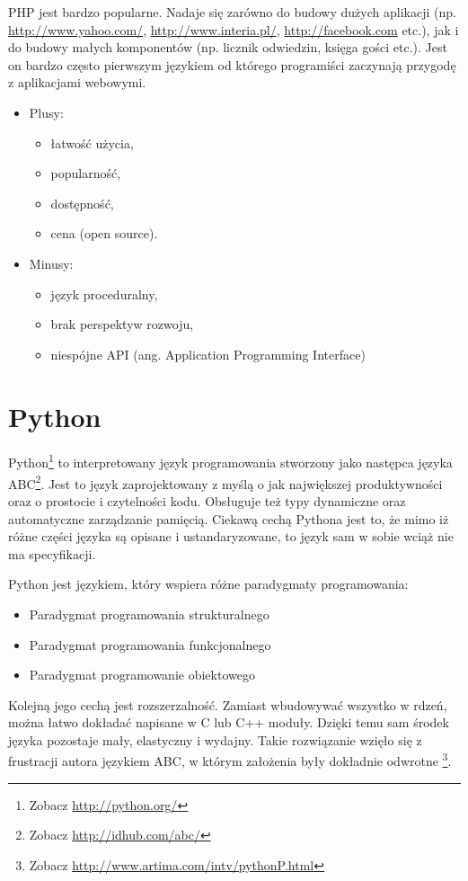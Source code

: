 \documentclass[a4paper,12pt,oneside]{report}
\begin{document}
PHP jest bardzo popularne. Nadaje się zarówno do budowy dużych aplikacji (np. \url{http://www.yahoo.com/}, \url{http://www.interia.pl/}, \url{http://facebook.com} etc.), jak i do budowy małych komponentów (np. licznik odwiedzin, księga gości etc.). Jest on bardzo często pierwszym językiem od którego programiści zaczynają przygodę z aplikacjami webowymi.
\begin{itemize}
\item Plusy:
  \begin{itemize}
  \item łatwość użycia, 
  \item popularność,
  \item dostępność,
  \item cena (open source).
  \end{itemize}
\item Minusy:
  \begin{itemize}
  \item język proceduralny,
  \item brak perspektyw rozwoju,
  \item niespójne API (ang. Application Programming Interface)
  \end{itemize}
\end{itemize}

\section{Python}
\label{sec:python}
Python\footnote{Zobacz \url{http://python.org/}} to interpretowany język programowania stworzony jako następca języka ABC\footnote{Zobacz \url{http://idhub.com/abc/}}. Jest to język zaprojektowany z myślą o jak największej produktywności oraz o prostocie i czytelności kodu. Obsługuje też typy dynamiczne oraz automatyczne zarządzanie pamięcią. Ciekawą cechą Pythona jest to, że mimo iż różne części języka są opisane i ustandaryzowane, to język sam w sobie wciąż nie ma specyfikacji. 

Python jest językiem, który wspiera różne paradygmaty programowania:
\begin{itemize}
  \item Paradygmat programowania strukturalnego
  \item Paradygmat programowania funkcjonalnego
  \item Paradygmat programowanie obiektowego
\end{itemize}

Kolejną jego cechą jest rozszerzalność. Zamiast wbudowywać wszystko w rdzeń, można łatwo dokładać napisane w C lub C++ moduły. Dzięki temu sam środek języka pozostaje mały, elastyczny i wydajny. Takie rozwiązanie wzięło się z frustracji autora językiem ABC, w którym założenia były dokładnie odwrotne \footnote{Zobacz \url{http://www.artima.com/intv/pythonP.html}}.
\end{document}
